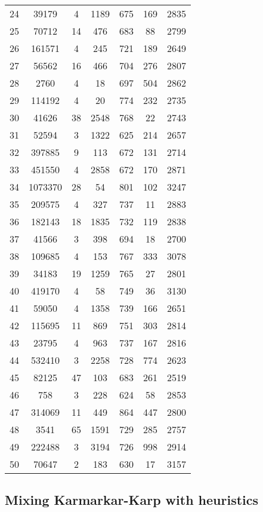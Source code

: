 \documentclass[tikz, 12pt]{scrartcl}
\begin{document}
\begin{longtable}{|c|cc|cc|cc|}
24	 &39179	 & 	4	 &1189	 & 	675	 &169	 & 	2835\\
25	 &70712	 & 	14	 &476	 & 	683	 &88	 & 	2799\\
26	 &161571	 & 	4	 &245	 & 	721	 &189	 & 	2649\\
27	 &56562	 & 	16	 &466	 & 	704	 &276	 & 	2807\\
28	 &2760	 & 	4	 &18	 & 	697	 &504	 & 	2862\\
29	 &114192	 & 	4	 &20	 & 	774	 &232	 & 	2735\\
30	 &41626	 & 	38	 &2548	 & 	768	 &22	 & 	2743\\
31	 &52594	 & 	3	 &1322	 & 	625	 &214	 & 	2657\\
32	 &397885	 & 	9	 &113	 & 	672	 &131	 & 	2714\\
33	 &451550	 & 	4	 &2858	 & 	672	 &170	 & 	2871\\
34	 &1073370	 & 	28	 &54	 & 	801	 &102	 & 	3247\\
35	 &209575	 & 	4	 &327	 & 	737	 &11	 & 	2883\\
36	 &182143	 & 	18	 &1835	 & 	732	 &119	 & 	2838\\
37	 &41566	 & 	3	 &398	 & 	694	 &18	 & 	2700\\
38	 &109685	 & 	4	 &153	 & 	767	 &333	 & 	3078\\
39	 &34183	 & 	19	 &1259	 & 	765	 &27	 & 	2801\\
40	 &419170	 & 	4	 &58	 & 	749	 &36	 & 	3130\\
41	 &59050	 & 	4	 &1358	 & 	739	 &166	 & 	2651\\
42	 &115695	 & 	11	 &869	 & 	751	 &303	 & 	2814\\
43	 &23795	 & 	4	 &963	 & 	737	 &167	 & 	2816\\
44	 &532410	 & 	3	 &2258	 & 	728	 &774	 & 	2623\\
45	 &82125	 & 	47	 &103	 & 	683	 &261	 & 	2519\\
46	 &758	 & 	3	 &228	 & 	624	 &58	 & 	2853\\
47	 &314069	 & 	11	 &449	 & 	864	 &447	 & 	2800\\
48	 &3541	 & 	65	 &1591	 & 	729	 &285	 & 	2757\\
49	 &222488	 & 	3	 &3194	 & 	726	 &998	 & 	2914\\
50	 &70647	 & 	2	 &183	 & 	630	 &17	 & 	3157\\
\hline
\end{longtable}


\subsection{Mixing Karmarkar-Karp with heuristics}
\end{document}

